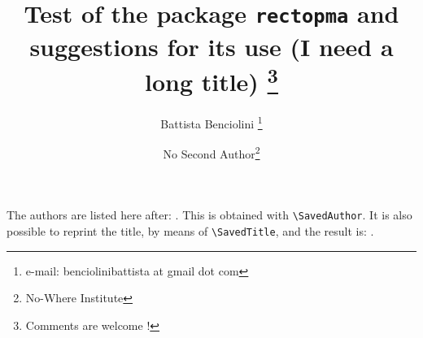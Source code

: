 \documentclass{article}
\title{Test of the package \texttt{rectopma}
\intitlebreak and suggestions for its use
\intitlebreakvs (I need a long title)%
\thanks{Comments are welcome !}}
\author{Battista Benciolini%
\thanks{e-mail: benciolinibattista at gmail dot com}%
\and    No Second Author\thanks{No-Where Institute}}%
\begin{document}
\SaveTopMatter
\maketitle
The authors are listed here after: \SavedAuthor.
This is obtained with \verb|\SavedAuthor|.
It is also possible to reprint the title,
by means of  \verb|\SavedTitle|,
and the result is: \SavedTitle.
\end{document}
